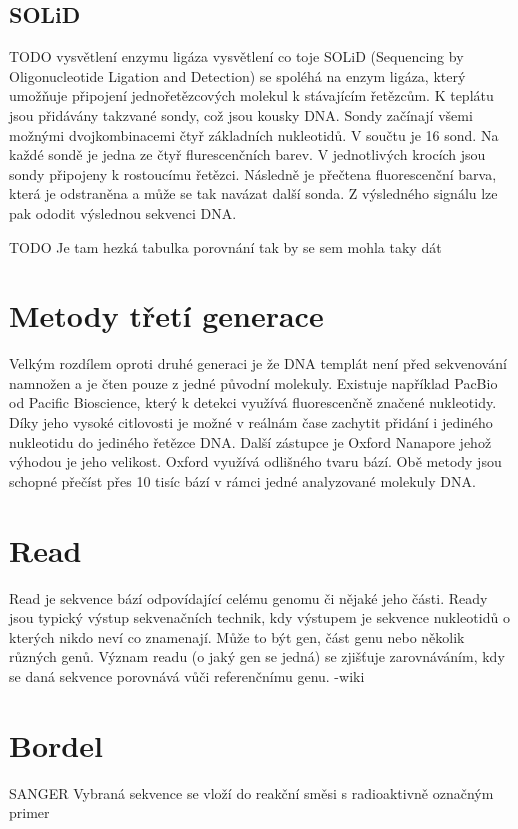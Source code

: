 \documentclass[czech,DP]{thesiskiv}
\numberwithin{equation}{section}
\begin{document}
\subsection{SOLiD}
TODO vysvětlení enzymu ligáza vysvětlení co toje
SOLiD (Sequencing by Oligonucleotide Ligation and Detection) se spoléhá na enzym ligáza, který umožňuje připojení jednořetězcových molekul k stávajícím řetězcům. K teplátu jsou přidávány takzvané sondy, což jsou kousky DNA. Sondy začínají všemi možnými dvojkombinacemi čtyř základních nukleotidů. V součtu je 16 sond. Na každé sondě je jedna ze čtyř flurescenčních barev. V jednotlivých krocích jsou sondy připojeny k rostoucímu řetězci. Následně je přečtena fluorescenční barva, která je odstraněna a může se tak navázat další sonda. Z výsledného signálu lze pak ododit výslednou sekvenci DNA.


TODO Je tam hezká tabulka porovnání tak by se sem mohla taky dát
\section{Metody třetí generace}
Velkým rozdílem oproti druhé generaci je že DNA templát není před sekvenování namnožen a je čten pouze z jedné původní molekuly. Existuje například PacBio od Pacific Bioscience, který k detekci využívá fluorescenčně značené nukleotidy. Díky jeho vysoké citlovosti je možné v reálnám čase zachytit přidání i jediného nukleotidu do jediného řetězce DNA. Další zástupce je Oxford Nanapore jehož výhodou je jeho velikost. Oxford využívá odlišného tvaru bází. Obě metody jsou schopné přečíst přes 10 tisíc bází v rámci jedné analyzované molekuly DNA. 






\section{Read}
Read je sekvence bází odpovídající celému genomu či nějaké jeho části. Ready jsou typický výstup sekvenačních technik, kdy výstupem je sekvence nukleotidů o kterých nikdo neví co znamenají. Může to být gen, část genu nebo několik různých genů. Význam readu (o jaký gen se jedná) se zjišťuje zarovnáváním, kdy se daná sekvence porovnává vůči referenčnímu genu.
-wiki  


\section{Bordel}
SANGER
Vybraná sekvence se vloží do reakční směsi s radioaktivně označným primer  
\end{document}
